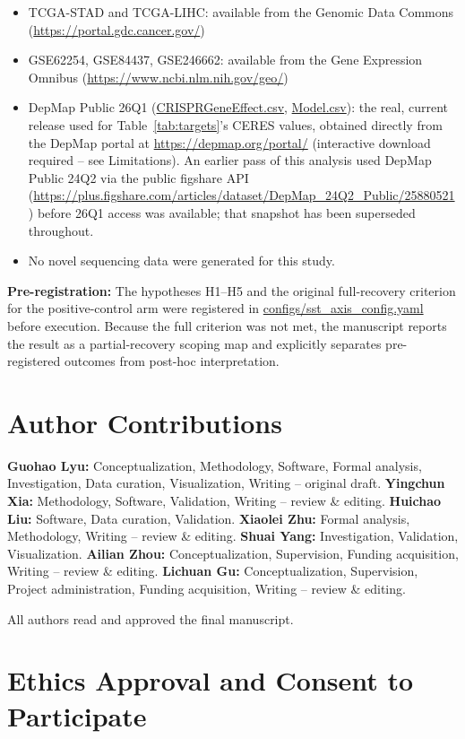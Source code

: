 \documentclass[modern,large,numbered,nocrop]{oup-authoring-template}
\begin{document}
\begin{itemize}
\item TCGA-STAD and TCGA-LIHC: available from the Genomic Data Commons (\url{https://portal.gdc.cancer.gov/})
\item GSE62254, GSE84437, GSE246662: available from the Gene Expression Omnibus (\url{https://www.ncbi.nlm.nih.gov/geo/})
\item DepMap Public 26Q1 (\url{CRISPRGeneEffect.csv}, \url{Model.csv}): the real, current release used for Table~\ref{tab:targets}'s CERES values, obtained directly from the DepMap portal at \url{https://depmap.org/portal/} (interactive download required -- see Limitations). An earlier pass of this analysis used DepMap Public 24Q2 via the public figshare API (\url{https://plus.figshare.com/articles/dataset/DepMap_24Q2_Public/25880521}) before 26Q1 access was available; that snapshot has been superseded throughout.
\item No novel sequencing data were generated for this study.
\end{itemize}

\textbf{Pre-registration:} The hypotheses H1--H5 and the original full-recovery criterion for the positive-control arm were registered in \url{configs/sst_axis_config.yaml} before execution. Because the full criterion was not met, the manuscript reports the result as a partial-recovery scoping map and explicitly separates pre-registered outcomes from post-hoc interpretation.

\section*{Author Contributions}

\textbf{Guohao Lyu:} Conceptualization, Methodology, Software, Formal analysis, Investigation, Data curation, Visualization, Writing -- original draft. \textbf{Yingchun Xia:} Methodology, Software, Validation, Writing -- review \& editing. \textbf{Huichao Liu:} Software, Data curation, Validation. \textbf{Xiaolei Zhu:} Formal analysis, Methodology, Writing -- review \& editing. \textbf{Shuai Yang:} Investigation, Validation, Visualization. \textbf{Ailian Zhou:} Conceptualization, Supervision, Funding acquisition, Writing -- review \& editing. \textbf{Lichuan Gu:} Conceptualization, Supervision, Project administration, Funding acquisition, Writing -- review \& editing.

All authors read and approved the final manuscript.

\section*{Ethics Approval and Consent to Participate}
\end{document}
